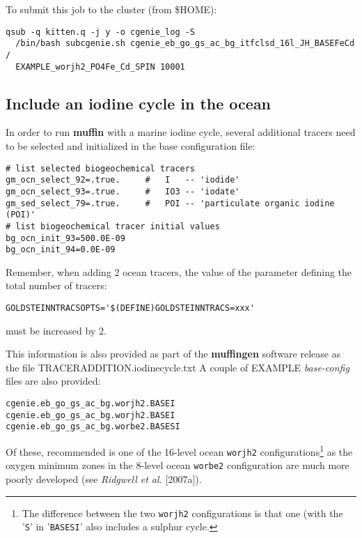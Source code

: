 \documentclass[11pt,fleqn]{book} %
\begin{document}
To submit this job to the cluster (from \$HOME):
\vspace{-4pt}\begin{verbatim}
qsub -q kitten.q -j y -o cgenie_log -S
  /bin/bash subcgenie.sh cgenie_eb_go_gs_ac_bg_itfclsd_16l_JH_BASEFeCd /
  EXAMPLE_worjh2_PO4Fe_Cd_SPIN 10001
\end{verbatim}\vspace{-4pt}

%
\newpage
\subsection*{Include an iodine cycle in the ocean}
\vspace{1mm}

In order to run \textbf{muffin} with a marine iodine cycle, several additional tracers need to be selected and initialized in the base configuration file:
\vspace{-1mm}\small\begin{verbatim}
# list selected biogeochemical tracers
gm_ocn_select_92=.true.     #   I   -- 'iodide' 
gm_ocn_select_93=.true.     #   IO3 -- 'iodate' 
gm_sed_select_79=.true.     #   POI -- 'particulate organic iodine (POI)'
# list biogeochemical tracer initial values
bg_ocn_init_93=500.0E-09
bg_ocn_init_94=0.0E-09
\end{verbatim}\normalsize\vspace{-1mm}
Remember, when adding 2 ocean tracers, the value of the parameter defining the total number of tracers:
\vspace{-2mm}\small\begin{verbatim}
GOLDSTEINNTRACSOPTS='$(DEFINE)GOLDSTEINNTRACS=xxx'
\end{verbatim}\normalsize\vspace{-2mm}
must be increased by 2.

This information is also provided as part of the \textbf{muffingen} software release as the file \textsf{\footnotesize TRACERADDITION.iodinecycle.txt} 
A couple of EXAMPLE \textit{base-config} files are also provided:
\vspace{-1mm}\small\begin{verbatim}
cgenie.eb_go_gs_ac_bg.worjh2.BASEI
cgenie.eb_go_gs_ac_bg.worjh2.BASEI
cgenie.eb_go_gs_ac_bg.worbe2.BASESI
\end{verbatim}\normalsize\vspace{-1mm}
Of these, recommended is one of the 16-level ocean \texttt{worjh2} configurations\footnote{The difference between the two \texttt{worjh2} configurations is that one (with the '\texttt{S}' in '\texttt{BASESI}' also includes a sulphur cycle.} as the oxygen minimum zones in the 8-level ocean \texttt{worbe2} configuration are much more poorly developed (see \textit{Ridgwell et al.} [2007a]).
\end{document}
